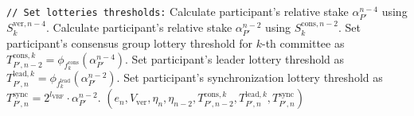 \begin{protocol}
\begin{algorithmic}[1]
        \noindent
        \lstinline|// Set lotteries thresholds:|
        \State Calculate participant's relative stake $\alpha^{n-4}_{P'}$ using $S_k^{\text{ver}, {n - 4}}$.
        \State Calculate participant's relative stake $\alpha^{n-2}_{P'}$ using $S_k^{\text{cons}, {n - 2}}$.
        \State Set participant's consensus group lottery threshold for $k$-th committee as $T_{P', n-2}^{\text{cons}, k} = \phi_{f^{\text{cons}}_k}(\alpha^{n-4}_{P'})$.
        \State Set participant's leader lottery threshold as $T_{P', n}^{\text{lead}, k} = \phi_{f^{\text{lead}}_k}(\alpha^{n-2}_{P'})$.
        \State Set participant's synchronization lottery threshold as $T_{P', n}^{\text{sync}} = 2^{l_{\text{VRF}}} \cdot \alpha^{n-2}_{P'}$.
        \State \Return ${(e_n, V_{\text{ver}}, \eta_{n}, \eta_{n - 2}, T_{P', n-2}^{\text{cons}, k}, T_{P', n}^{\text{lead}, k}, T_{P', n}^{\text{sync}})}$
    \end{algorithmic}\label{alg:prepare-block-validation}
\end{protocol}

